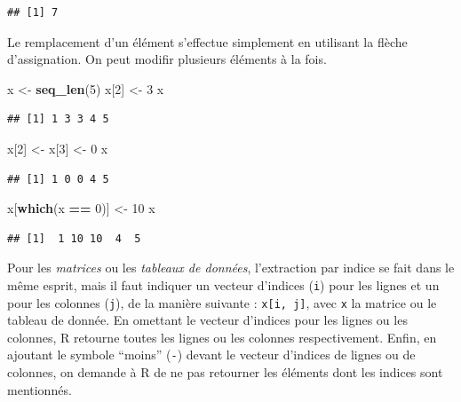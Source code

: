 \documentclass[
  11pt,
]{book}
\newenvironment{Shaded}{\begin{snugshade}}{\end{snugshade}}
\newcommand{\DecValTok}[1]{\textcolor[rgb]{0.00,0.00,0.81}{#1}}
\newcommand{\KeywordTok}[1]{\textcolor[rgb]{0.13,0.29,0.53}{\textbf{#1}}}
\newcommand{\NormalTok}[1]{#1}
\newcommand{\OperatorTok}[1]{\textcolor[rgb]{0.81,0.36,0.00}{\textbf{#1}}}
\newcommand{\StringTok}[1]{\textcolor[rgb]{0.31,0.60,0.02}{#1}}
\numberwithin{equation}{section}
\numberwithin{countremarque}{section}
\begin{document}
\begin{lstlisting}
## [1] 7
\end{lstlisting}

Le remplacement d'un élément s'effectue simplement en utilisant la flèche d'assignation. On peut modifir plusieurs éléments à la fois.

\begin{Shaded}
\begin{Highlighting}[]
\NormalTok{x \textless{}{-}}\StringTok{ }\KeywordTok{seq\_len}\NormalTok{(}\DecValTok{5}\NormalTok{)}
\NormalTok{x[}\DecValTok{2}\NormalTok{] \textless{}{-}}\StringTok{ }\DecValTok{3}
\NormalTok{x}
\end{Highlighting}
\end{Shaded}

\begin{lstlisting}
## [1] 1 3 3 4 5
\end{lstlisting}

\begin{Shaded}
\begin{Highlighting}[]
\NormalTok{x[}\DecValTok{2}\NormalTok{] \textless{}{-}}\StringTok{ }\NormalTok{x[}\DecValTok{3}\NormalTok{] \textless{}{-}}\StringTok{ }\DecValTok{0}
\NormalTok{x}
\end{Highlighting}
\end{Shaded}

\begin{lstlisting}
## [1] 1 0 0 4 5
\end{lstlisting}

\begin{Shaded}
\begin{Highlighting}[]
\NormalTok{x[}\KeywordTok{which}\NormalTok{(x }\OperatorTok{==}\StringTok{ }\DecValTok{0}\NormalTok{)] \textless{}{-}}\StringTok{ }\DecValTok{10}
\NormalTok{x}
\end{Highlighting}
\end{Shaded}

\begin{lstlisting}
## [1]  1 10 10  4  5
\end{lstlisting}

Pour les \emph{matrices} ou les \emph{tableaux de données}, l'extraction par indice se fait dans le même esprit, mais il faut indiquer un vecteur d'indices (\texttt{i}) pour les lignes et un pour les colonnes (\texttt{j}), de la manière suivante : \texttt{x{[}i,\ j{]}}, avec \texttt{x} la matrice ou le tableau de donnée. En omettant le vecteur d'indices pour les lignes ou les colonnes, R retourne toutes les lignes ou les colonnes respectivement. Enfin, en ajoutant le symbole ``moins'' (\texttt{-}) devant le vecteur d'indices de lignes ou de colonnes, on demande à R de ne pas retourner les éléments dont les indices sont mentionnés.
\end{document}
